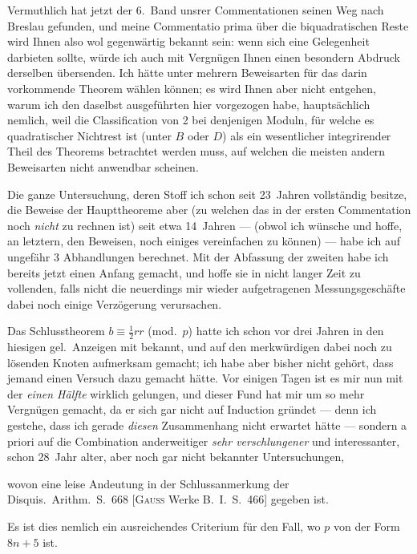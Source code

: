 \documentclass[10pt,a4paper]{article}
\begin{document}
Vermuthlich hat jetzt der 6.~Band unsrer Commentationen seinen Weg nach Breslau gefunden, und meine Commentatio prima \"uber die biquadratischen Reste wird Ihnen also wol gegenw\"artig bekannt sein: wenn sich eine Gelegenheit darbieten sollte, w\"urde ich auch mit Vergn\"ugen Ihnen einen besondern Abdruck derselben \"ubersenden. Ich h\"atte unter mehrern Beweisarten f\"ur das darin vorkommende Theorem w\"ahlen k\"onnen; es wird Ihnen aber nicht entgehen, warum ich den daselbst ausgef\"uhrten hier vorgezogen habe, haupts\"achlich nemlich, weil die Classification von 2 bei denjenigen Moduln, f\"ur welche es quadratischer Nichtrest ist (unter $B$ oder $D$) als ein wesentlicher integrirender Theil des Theorems betrachtet werden muss, auf welchen die meisten andern Beweisarten nicht anwendbar scheinen.

Die ganze Untersuchung, deren Stoff ich schon seit 23~Jahren vollst\"andig besitze, die Beweise der Haupttheoreme aber (zu welchen das in der ersten Commentation noch \textit{nicht} zu rechnen ist) seit etwa 14~Jahren --- (obwol ich w\"unsche und hoffe, an letztern, den Beweisen, noch einiges vereinfachen zu k\"onnen) --- habe ich auf ungef\"ahr 3 Abhandlungen berechnet. Mit der Abfassung der zweiten habe ich bereits jetzt einen Anfang gemacht, und hoffe sie in nicht langer Zeit zu vollenden, falls nicht die neuerdings mir wieder aufgetragenen Messungsgesch\"afte dabei noch einige Verz\"ogerung verursachen.

Das Schlusstheorem $b \equiv \frac{1}{2}rr$ (mod.~$p$) hatte ich schon vor drei Jahren in den hiesigen gel.~Anzeigen mit bekannt, und auf den merkw\"urdigen dabei noch zu l\"osenden Knoten aufmerksam gemacht; ich habe aber bisher nicht geh\"ort, dass jemand einen Versuch dazu gemacht h\"atte. Vor einigen Tagen ist es mir nun mit der \textit{einen H\"alfte} wirklich gelungen, und dieser Fund hat mir um so mehr Vergn\"ugen gemacht, da er sich gar nicht auf Induction gr\"undet --- denn ich gestehe, dass ich gerade \textit{diesen} Zusammenhang nicht erwartet h\"atte --- sondern a priori auf die Combination anderweitiger \textit{sehr verschlungener} und interessanter, schon 28~Jahr alter, aber noch gar nicht bekannter Untersuchungen,

\newpage

wovon eine leise Andeutung in der Schlussanmerkung der Disquis.~Arithm.~S.~668 [\textsc{Gau\ss} Werke B.~I.~S.~466] gegeben ist.

Es ist dies nemlich ein ausreichendes Criterium f\"ur den Fall, wo $p$ von der Form $8n+5$ ist.
\end{document}
